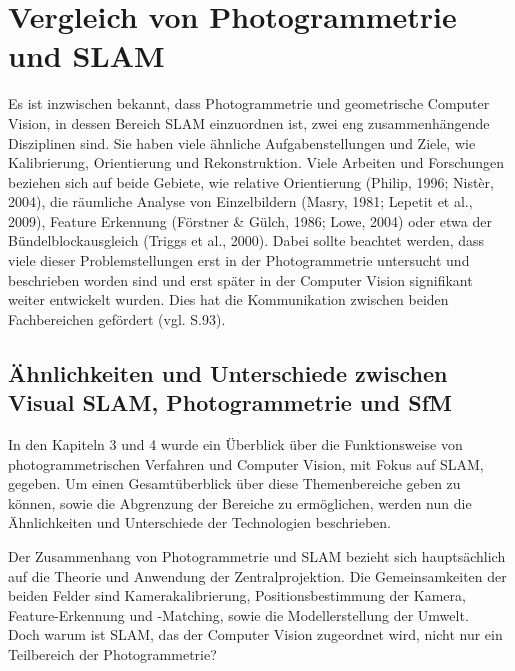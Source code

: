 \chapter{Vergleich von Photogrammetrie und SLAM}

Es ist inzwischen bekannt, dass Photogrammetrie und geometrische Computer Vision, in dessen Bereich SLAM einzuordnen ist, zwei eng zusammenhängende Disziplinen sind. Sie haben viele ähnliche Aufgabenstellungen und Ziele, wie Kalibrierung, Orientierung und Rekonstruktion. Viele Arbeiten und Forschungen beziehen sich auf beide Gebiete, wie relative Orientierung (Philip, 1996; Nistèr, 2004), die räumliche Analyse von Einzelbildern (Masry, 1981; Lepetit et al., 2009), Feature Erkennung  (Förstner \& Gülch, 1986; Lowe, 2004) oder etwa der Bündelblockausgleich  (Triggs et al., 2000). Dabei sollte beachtet werden, dass viele dieser Problemstellungen erst in der Photogrammetrie untersucht und beschrieben worden sind und erst später in der Computer Vision signifikant weiter entwickelt wurden. Dies hat die Kommunikation zwischen beiden Fachbereichen gefördert (vgl. \cite{ph_vs_cv} S.93).


\section{Ähnlichkeiten und Unterschiede zwischen Visual SLAM, Photogrammetrie und SfM}

In den Kapiteln 3 und 4 wurde ein Überblick über die Funktionsweise von photogrammetrischen Verfahren und Computer Vision, mit Fokus auf SLAM, gegeben. Um einen Gesamtüberblick über diese Themenbereiche geben zu können, sowie die Abgrenzung der Bereiche zu ermöglichen, werden nun die Ähnlichkeiten und Unterschiede der Technologien beschrieben. 

Der Zusammenhang von Photogrammetrie und SLAM bezieht sich hauptsächlich auf die Theorie und Anwendung der Zentralprojektion. Die Gemeinsamkeiten der beiden Felder sind Kamerakalibrierung, Positionsbestimmung der Kamera, Feature-Erkennung und -Matching, sowie die  Modellerstellung der Umwelt. \\ Doch warum ist SLAM, das der Computer Vision zugeordnet wird, nicht nur ein Teilbereich der Photogrammetrie?

